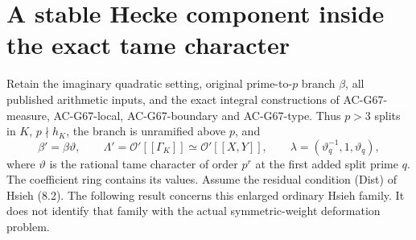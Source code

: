 \section{A stable Hecke component inside the exact tame character}
\label{sec:cubic-hsieh-tame-stable}

Retain the imaginary quadratic setting, original prime-to-$p$
branch $\beta$, all published arithmetic inputs, and the exact
integral constructions of AC-G67-measure, AC-G67-local,
AC-G67-boundary and AC-G67-type.  Thus $p>3$ splits in $K$,
$p\nmid h_K$, the branch is unramified above $p$, and
\[
 \beta'=\beta\vartheta,
 \qquad \Lambda'=\mathcal O'[[\Gamma_K]]
             \simeq\mathcal O'[[X,Y]],
 \qquad \lambda=(\vartheta_q^{-1},1,\vartheta_q),
                                                        \tag{G70.1}
\]
where $\vartheta$ is the rational tame character of order
$p^r$ at the first added split prime $q$.
The coefficient ring contains its values.  Assume the
residual condition \textup{(Dist)} of Hsieh (8.2).
The following result concerns this enlarged ordinary Hsieh
family.  It does not identify that family with the actual
symmetric-weight deformation problem.

